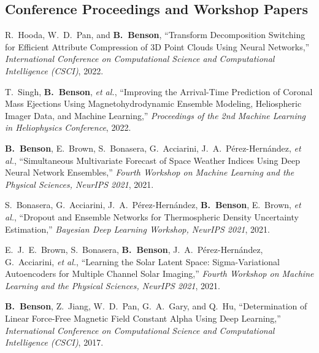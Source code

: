 \documentclass[11pt,letterpaper]{article}
\newcommand{\me}{\textbf{B.~Benson}}
\begin{document}
\subsection{Conference Proceedings and Workshop Papers}
\begin{pubs}[resume]
  \item R.~Hooda, W.~D.~Pan, and \me, ``Transform Decomposition Switching for Efficient Attribute Compression of 3D Point Clouds Using Neural Networks,'' \textit{International Conference on Computational Science and Computational Intelligence (CSCI)}, 2022.
  \item T.~Singh, \me, \textit{et al.}, ``Improving the Arrival-Time Prediction of Coronal Mass Ejections Using Magnetohydrodynamic Ensemble Modeling, Heliospheric Imager Data, and Machine Learning,'' \textit{Proceedings of the 2nd Machine Learning in Heliophysics Conference}, 2022.
  \item \me, E.~Brown, S.~Bonasera, G.~Acciarini, J.~A.~P\'erez-Hern\'andez, \textit{et al.}, ``Simultaneous Multivariate Forecast of Space Weather Indices Using Deep Neural Network Ensembles,'' \textit{Fourth Workshop on Machine Learning and the Physical Sciences, NeurIPS 2021}, 2021.
  \item S.~Bonasera, G.~Acciarini, J.~A.~P\'erez-Hern\'andez, \me, E.~Brown, \textit{et al.}, ``Dropout and Ensemble Networks for Thermospheric Density Uncertainty Estimation,'' \textit{Bayesian Deep Learning Workshop, NeurIPS 2021}, 2021.
  \item E.~J.~E.~Brown, S.~Bonasera, \me, J.~A.~P\'erez-Hern\'andez, G.~Acciarini, \textit{et al.}, ``Learning the Solar Latent Space: Sigma-Variational Autoencoders for Multiple Channel Solar Imaging,'' \textit{Fourth Workshop on Machine Learning and the Physical Sciences, NeurIPS 2021}, 2021.
  \item \me, Z.~Jiang, W.~D.~Pan, G.~A.~Gary, and Q.~Hu, ``Determination of Linear Force-Free Magnetic Field Constant Alpha Using Deep Learning,'' \textit{International Conference on Computational Science and Computational Intelligence (CSCI)}, 2017.
\end{pubs}
\end{document}
